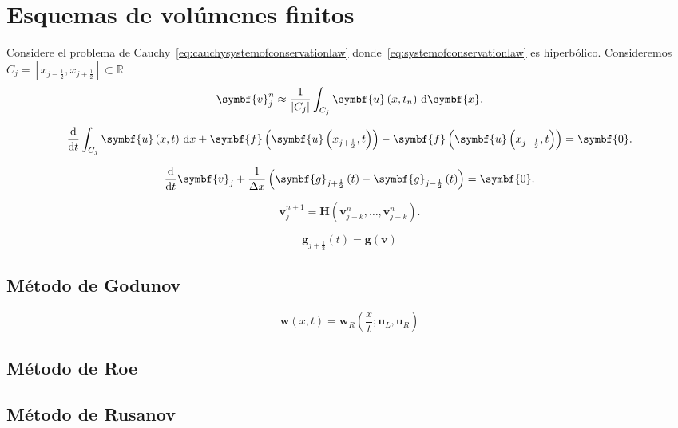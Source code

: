 \chapter{Esquemas de volúmenes finitos}

Considere el problema de Cauchy~\eqref{eq:cauchysystemofconservationlaw}
donde~\eqref{eq:systemofconservationlaw} es hiperbólico.
Consideremos $C_{j}=\left[x_{j-\frac{1}{2}},x_{j+\frac{1}{2}}\right]\subset\mathbb{R}$
\begin{equation*}
	\symbf{v}^{n}_{j}\approx
	\frac{1}{\left|C_{j}\right|}
	\int_{C_{j}}
	\symbf{u}\left(x,t_{n}\right)\dl{\symbf{x}}.
\end{equation*}

\begin{equation*}
	\diff{}{t}
	\int_{C_{j}}
	\symbf{u}\left(x,t\right)\dl x+
	\symbf{f}\left(\symbf{u}\left(x_{j+\frac{1}{2}},t\right)\right)-
	\symbf{f}\left(\symbf{u}\left(x_{j-\frac{1}{2}},t\right)\right)=
	\symbf{0}.
\end{equation*}

\begin{equation*}
	\diff{}{t}\symbf{v}_{j}+
	\frac{1}{\Delta x}
	\left(
		\symbf{g}_{j+\frac{1}{2}}\left(t\right)-
		\symbf{g}_{j-\frac{1}{2}}\left(t\right)
		\right)=
		\symbf{0}.
\end{equation*}

\begin{equation*}
	\symbf{v}^{n+1}_{j}=
	\symbf{H}\left(\symbf{v}^{n}_{j-k},\dotsc,\symbf{v}^{n}_{j+k}\right).
\end{equation*}

\begin{equation*}
	\symbf{g}_{j+\frac{1}{2}}\left(t\right)=
	\symbf{g}\left(\symbf{v}\right)
\end{equation*}

\section{Método de Godunov}

\begin{equation*}
	\symbf{w}\left(x,t\right)=
	\symbf{w}_{R}
	\left(\frac{x}{t};\symbf{u}_{L},\symbf{u}_{R}\right)
\end{equation*}

\section{Método de Roe}

\section{Método de Rusanov}
